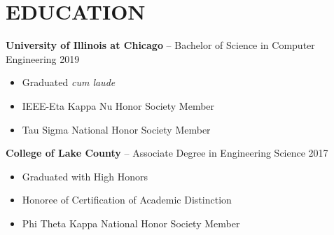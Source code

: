 \documentclass[11pt,letterpaper]{article}
\newcommand{\subheading}[3]{
    \textbf{#1}{ #2 }{\hfill #3 \vspace{-2pt}}
}
\begin{document}
\section*{EDUCATION}
\subheading{University of Illinois at Chicago}{-- Bachelor of Science in Computer Engineering}{2019} \\
\vspace{-8pt}
\begin{itemize}
  \item Graduated \textit{cum laude}
  \item IEEE-Eta Kappa Nu Honor Society Member \\ %
  \item Tau Sigma National Honor Society Member
\end{itemize}
\vspace{-5pt}
\subheading{College of Lake County}{-- Associate Degree in Engineering Science}{2017 } \\
\vspace{-8pt}
\begin{itemize}
  \item Graduated with High Honors
  \item Honoree of Certification of Academic Distinction
  \item Phi Theta Kappa National Honor Society Member
\end{itemize}
\vspace{-10pt}
\end{document}
